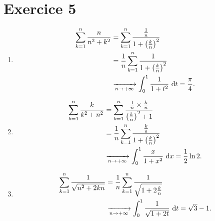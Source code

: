 \part{Exercice 5}

\begin{enumerate}
	\item 
		\begin{align*}
			\sum_{k=1}^n \frac{n}{n^2+k^2} &= \sum_{k=1}^n \frac{\frac{1}{n}}{1+\left( \frac{k}{n} \right)^2} \\
			&= \frac{1}{n} \sum_{k=1}^n \frac{1}{1+\left( \frac{k}{n} \right)^2} \\
			&\xrightarrow[n\to +\infty]{} \int_{0}^{1} \frac{1}{1+t^2}~\mathrm{d}t = \frac{\pi}{4}.
		\end{align*}
	\item
		\begin{align*}
			\sum_{k=1}^n \frac{k}{k^2 + n^2} &= \sum_{k=1}^n \frac{\frac{1}{n}\times \frac{k}{n}}{\left( \frac{k}{n} \right)^2 + 1} \\
			&= \frac{1}{n} \sum_{k=1}^n \frac{\frac{k}{n}}{1 + \left( \frac{k}{n} \right)^2} \\
			&\xrightarrow[n\to +\infty]{} \int_{0}^{1} \frac{x}{1+x^2}~\mathrm{d}x = \frac{1}{2} \ln 2. \\
		\end{align*}
	\item
		\begin{align*}
			\sum_{k=1}^n \frac{1}{\sqrt{n^2 + 2kn}} &= \frac{1}{n} \sum_{k=1}^n \frac{1}{\sqrt{1+2 \frac{k}{n}}}\\
			&\xrightarrow[n\to +\infty]{} \int_{0}^{1} \frac{1}{\sqrt{1+2t}}~\mathrm{d}t = \sqrt{3} - 1.
		\end{align*}
\end{enumerate}
